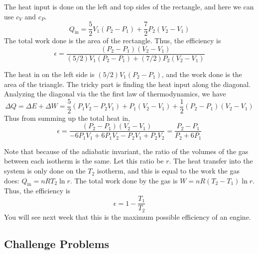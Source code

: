 \documentclass[11pt]{scrartcl}
\begin{document}
\begin{sol}
    \begin{anum}
        \item The heat input is done on the left and top sides of the rectangle, and here we can use $c_V$ and $c_P$. $$Q_{\text{in}}=\frac52V_1(P_2-P_1)+\frac72P_2(V_2-V_1)$$The total work done is the area of the rectangle. Thus, the efficiency is $$\epsilon=\boxed{\frac{(P_2-P_1)(V_2-V_1)}{(5/2)V_1(P_2-P_1)+(7/2)P_2(V_2-V_1)}}$$
        \item The heat in on the left side is $(5/2)V_1(P_2-P_1)$, and the work done is the area of the triangle. The tricky part is finding the heat input along the diagonal. Analyzing the diagonal via the the first law of thermodynamics, we have $$\Delta Q=\Delta E+\Delta W=\frac52(P_1V_2-P_2V_1)+P_1(V_2-V_1)+\frac12(P_2-P_1)(V_2-V_1)$$Thus from summing up the total heat in, $$\epsilon = \frac{(P_2-P_1)(V_2-V_1)}{-6P_1V_1+6P_1V_2-P_2V_1+P_2V_2}=\boxed{\frac{P_2-P_1}{P_2+6P_1}}$$
        \item Note that because of the adiabatic invariant, the ratio of the volumes of the gas between each isotherm is the same. Let this ratio be $r$. The heat transfer into the system is only done on the $T_2$ isotherm, and this is equal to the work the gas does: $Q_{\text{in}}=nRT_2\ln r$. The total work done by the gas is $W=nR(T_2-T_1)\ln r$. Thus, the efficiency is $$\epsilon=\boxed{1-\frac{T_1}{T_2}}$$You will see next week that this is the maximum possible efficiency of an engine. 
    \end{anum}
\end{sol}

\subsection{Challenge Problems}
\end{document}
